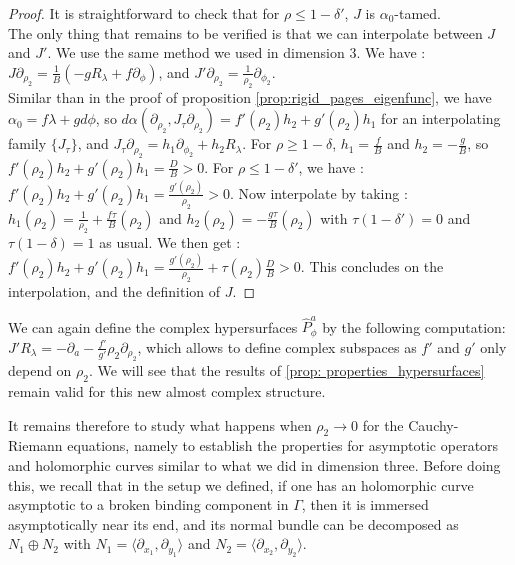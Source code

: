 \documentclass[../main.tex]{subfiles}
\begin{document}
\begin{proof}
It is straightforward to check that for $\rho \leq 1-\delta'$, $J$ is $\alpha_0$-tamed.\\
The only thing that remains to be verified is that we can interpolate between $J$ and $J'$. We use the same method we used in dimension $3$. We have : $J\partial_{\rho_2} = \frac{1}{B}(-gR_\lambda + f\partial_\phi)$, and $J'\partial_{\rho_2} = \frac{1}{\rho_2}\partial_{\phi_2}$. \\
Similar than in the proof of proposition \ref{prop:rigid_pages_eigenfunc}, we have $\alpha_0 = f\lambda + gd\phi$, so $d\alpha(\partial_{\rho_2},J_\tau\partial_{\rho_2}) = f'(\rho_2)h_2 + g'(\rho_2)h_1$ for an interpolating family $\{J_\tau\}$, and $J_\tau \partial_{\rho_2} =  h_1\partial_{\phi_2} + h_2R_\lambda$. For $\rho \geq 1-\delta$, $h_1 = \frac{f}{B}$ and $h_2 = -\frac{g}{B}$, so $ f'(\rho_2)h_2 + g'(\rho_2)h_1 = \frac{D}{B}> 0$. 
For $\rho\leq 1-\delta'$, we have : $f'(\rho_2)h_2 + g'(\rho_2)h_1 = \frac{g'(\rho_2)}{\rho_2} > 0$. Now interpolate by taking : $h_1(\rho_2) = \frac{1}{\rho_2} + \frac{f\tau}{B}(\rho_2)$ and $h_2(\rho_2) = -\frac{g\tau}{B}(\rho_2)$ with $\tau(1-\delta') = 0$ and $\tau(1-\delta) = 1$ as usual. We then get : $f'(\rho_2)h_2 + g'(\rho_2)h_1 = \frac{g'(\rho_2)}{\rho_2} + \tau(\rho_2)\frac{D}{B} > 0$. This concludes on the interpolation, and the definition of $J$.
\end{proof}

\begin{remark}
We can again define the complex hypersurfaces $\hat{P}_\phi^a$ by the following computation: $J'R_\lambda = -\partial_a -\frac{f'}{g'}\rho_2\partial_{\rho_2}$, which allows to define complex subspaces as $f'$ and $g'$ only depend on $\rho_2$. We will see that the results of \ref{prop: properties_hypersurfaces} remain valid for this new almost complex structure.
\end{remark}

It remains therefore to study what happens when $\rho_2\rightarrow 0$ for the Cauchy-Riemann equations, namely to establish the properties for asymptotic operators and holomorphic curves similar to what we did in dimension three. Before doing this, we recall that in the setup we defined, if one has an holomorphic curve asymptotic to a broken binding component in $\Gamma$, then it is immersed asymptotically near its end, and its normal bundle can be decomposed as $N_1 \oplus N_2$ with $N_1 = \langle\partial_{x_1},\partial_{y_1}\rangle$ and $N_2 = \langle \partial_{x_2},\partial_{y_2}\rangle$. 
\end{document}
